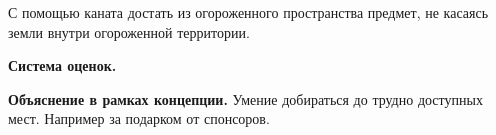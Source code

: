 
\par С помощью каната достать из огороженного пространства предмет, не касаясь земли внутри огороженной территории.

\par \textbf{Система оценок.}

\par \textbf{Объяснение в рамках концепции.} Умение добираться до трудно доступных мест. Например за подарком от спонсоров.
